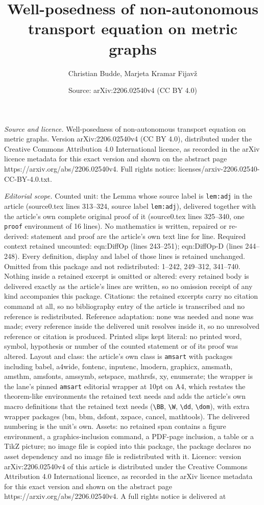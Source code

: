 \documentclass[10pt,a4paper]{amsart}
\title[Well-posedness of non-autonomous transport equation on metri]{Well-posedness of non-autonomous transport equation on metric graphs}
\author{Christian Budde, Marjeta Kramar Fijav\v{z}}
\date{Source: arXiv:2206.02540v4 (CC BY 4.0)}
\begin{document}
\maketitle

\noindent\emph{Source and licence.} Well-posedness of non-autonomous transport equation on metric graphs. Version arXiv:2206.02540v4 (CC BY 4.0), distributed under the Creative Commons Attribution 4.0 International licence, as recorded in the arXiv licence metadata for this exact version and shown on the abstract page https://arxiv.org/abs/2206.02540v4. Full rights notice: licenses/arxiv-2206.02540-CC-BY-4.0.txt.\par\smallskip

\noindent\textit{Editorial scope.} Counted unit: the Lemma whose source label is \texttt{lem:adj} in the article (source0.tex lines 313--324, source label \texttt{lem:adj}), delivered together with the article's own complete original proof of it (source0.tex lines 325--340, one \texttt{proof} environment of 16 lines). No mathematics is written, repaired or re-derived: statement and proof are the article's own text line for line. Required context retained uncounted: eqn:DiffOp (lines 243--251); eqn:DiffOp-D (lines 244--248). Every definition, display and label of those lines is retained unchanged. Omitted from this package and not redistributed: 1--242, 249--312, 341--740. Nothing inside a retained excerpt is omitted or altered: every retained body is delivered exactly as the article's lines are written, so no omission receipt of any kind accompanies this package. Citations: the retained excerpts carry no citation command at all, so no bibliography entry of the article is transcribed and no reference is redistributed. Reference adaptation: none was needed and none was made; every reference inside the delivered unit resolves inside it, so no unresolved reference or citation is produced. Printed slips kept literal: no printed word, symbol, hypothesis or number of the counted statement or of its proof was altered. Layout and class: the article's own class is \texttt{amsart} with packages including babel, a4wide, fontenc, inputenc, lmodern, graphicx, amsmath, amsthm, amsfonts, amssymb, setspace, mathrsfs, xy, enumerate; the wrapper is the lane's pinned \texttt{amsart} editorial wrapper at 10pt on A4, which restates the theorem-like environments the retained text needs and adds the article's own macro definitions that the retained text needs (\texttt{\textbackslash BB}, \texttt{\textbackslash W}, \texttt{\textbackslash dd}, \texttt{\textbackslash dom}), with extra wrapper packages (bm, bbm, dsfont, xspace, cancel, mathtools). The delivered numbering is the unit's own. Assets: no retained span contains a figure environment, a graphics-inclusion command, a PDF-page inclusion, a table or a TikZ picture; no image file is copied into this package, the package declares no asset dependency and no image file is redistributed with it. Licence: version arXiv:2206.02540v4 of this article is distributed under the Creative Commons Attribution 4.0 International licence, as recorded in the arXiv licence metadata for this exact version and shown on the abstract page https://arxiv.org/abs/2206.02540v4. A full rights notice is delivered at 
\end{document}
